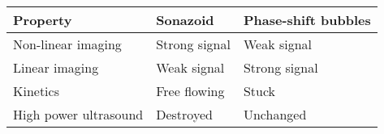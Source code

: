 \documentclass[b5paper, twoside, titlepage, 10pt]{article}
\begin{document}
\setcounter{equation}{42}
\begin{tabular}{@{}l l l @{}}
\toprule
  Property & Sonazoid\texttrademark{} & Phase-shift bubbles \\
  \midrule
  Non-linear imaging & Strong signal & Weak signal \\
  Linear imaging & Weak signal & Strong signal \\
  Kinetics & Free flowing & Stuck \\
  High power ultrasound & Destroyed &Unchanged\\
  \bottomrule
\end{tabular}
\end{document}
